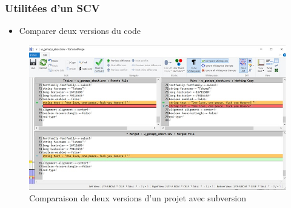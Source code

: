 \documentclass{beamer}
\begin{document}
\begin{frame}
\frametitle{Utilitées d'un SCV}
\begin{block}{}
\begin{itemize}
\item Comparer deux versions du code
\end{itemize}
\end{block}
\begin{figure}
 \includegraphics[width=.8\textwidth]{../images/changement.jpg}
 \caption{Comparaison de deux versions d'un projet avec subversion}
 \label{fig:changement}
\end{figure}
\end{frame}
\end{document}

